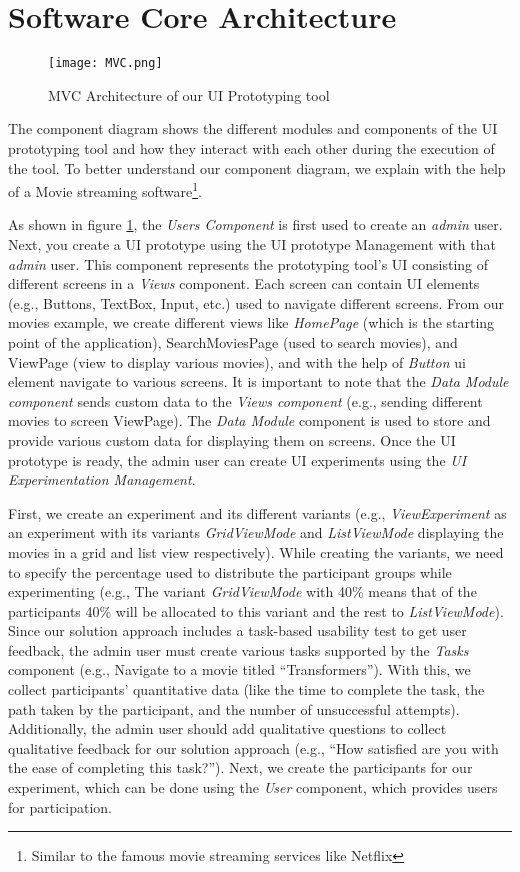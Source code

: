 \section{Software Core Architecture}
\label{sc:section:architecture}
\begin{figure}[htbp!]
    \centering    
    \texttt{[image: MVC.png]} 
    \caption[MVC Architecture of System]{MVC Architecture of our UI Prototyping tool}
    \label{fig:sc:componentD}
\end{figure}
The component diagram shows the different modules and components of the UI prototyping tool and how they interact with each other during the execution of the tool.
To better understand our component diagram, we explain with the help of a Movie streaming software\footnote{Similar to the famous movie streaming services like Netflix}.

As shown in figure \ref{fig:sc:componentD}, the \textit{Users Component} is first used to create an \textit{admin} user. 
Next, you create a UI prototype using the UI prototype Management with that \textit{admin} user. 
This component represents the prototyping tool's UI consisting of different screens in a \textit{Views} component. 
Each screen can contain UI elements (e.g., Buttons, TextBox, Input, etc.) used to navigate different screens.
From our movies example, we create different views like \textit{HomePage} (which is the starting point of the application), SearchMoviesPage (used to search movies), and ViewPage (view to display various movies), and with the help of \textit{Button} \ac{ui} element navigate to various screens.
It is important to note that the \textit{Data Module component} sends custom data to the \textit{Views component} (e.g., sending different movies to screen ViewPage).
The \textit{Data Module} component is used to store and provide various custom data for displaying them on screens.
Once the UI prototype is ready, the admin user can create UI experiments using the \textit{UI Experimentation Management}.

First, we create an experiment and its different variants (e.g., \textit{ViewExperiment} as an experiment with its variants \textit{GridViewMode} and \textit{ListViewMode} displaying the movies in a grid and list view respectively). 
While creating the variants, we need to specify the percentage used to distribute the participant groups while experimenting (e.g., The variant \textit{GridViewMode} with 40\% means that of the participants 40\% will be allocated to this variant and the rest to \textit{ListViewMode}).
Since our solution approach includes a task-based usability test to get user feedback, the admin user must create various tasks supported by the \textit{Tasks} component (e.g., Navigate to a movie titled ``Transformers'').
With this, we collect participants' quantitative data (like the time to complete the task, the path taken by the participant, and the number of unsuccessful attempts). 
Additionally, the admin user should add qualitative questions to collect qualitative feedback for our solution approach (e.g., ``How satisfied are you with the ease of completing this task?'').
Next, we create the participants for our experiment, which can be done using the \textit{User} component, which provides users for participation.

